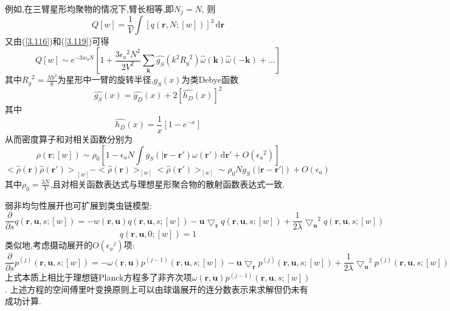 例如,在三臂星形均聚物的情况下,臂长相等,即$N_j = N$,
则
\begin{equation}
Q[w] = \frac{1}{V} \int [q(\mathbf{r},N;[w])]^3\,\mathrm{d} \mathbf{r}
\end{equation}
又由(\ref{3.116})和(\ref{3.119})可得
\begin{equation}
Q[w] \sim e^{-3w_0 N} [1+\frac{3 {\epsilon_a}^2 N^2}{2V^2} \sum_{\mathbf{k}} \hat{g_S}(k^2 {R_g}^2)\hat{\omega}(\mathbf{k})\hat{\omega}(-\mathbf{k})+\dots]
\end{equation}
其中${R_g}^2 = \frac{Nb^2}{6}$为星形中一臂的旋转半径,$g_S(x)$为类Debye函数
\begin{equation}
\hat{g_S}(x) = \hat{g_D}(x) + 2[\hat{h_D}(x)]^2
\end{equation}
其中
\begin{equation}
\hat{h_D}(x) = \frac{1}{x} [1-e^{-x}]
\end{equation}
从而密度算子和对相关函数分别为
\begin{equation}
\rho(\mathbf{r};[w]) \sim \rho_0[1-\epsilon_a N \int g_S(|\mathbf{r}-\mathbf{r}') \omega(\mathbf{r}')\,\mathrm{d} \mathbf{r}'+O({\epsilon_a}^2)]
\end{equation}
\begin{equation}
{<\hat{\rho}(\mathbf{r})\hat{\rho}(\mathbf{r}')>}_{[w]} -<\hat{\rho}(\mathbf{r})>_{[w]} <\hat{\rho}(\mathbf{r}')>_{[w]} \sim \rho_0 N g_S(|\mathbf{r}-\mathbf{r}'|)+O(\epsilon_a)
\end{equation}
其中$\rho_0 = \frac{3N}{V}$,且对相关函数表达式与理想星形聚合物的散射函数表达式一致.

弱非均匀性展开也可扩展到类虫链模型:
$$\frac{\partial}{\partial s}q(\mathbf{r},\mathbf{u},s;[w]) = -w(\mathbf{r},\mathbf{u})q(\mathbf{r},\mathbf{u},s;[w])-\mathbf{u} \bigtriangledown_{\mathbf{r}} q(\mathbf{r},\mathbf{u},s;[w])+\frac{1}{2 \lambda}{\bigtriangledown_{\mathbf{u}}}^2 q(\mathbf{r},\mathbf{u},s;[w])$$
$$q(\mathbf{r},\mathbf{u},0;[w]) = 1$$
类似地,考虑摄动展开的$O({\epsilon_a}^j)$项:
\begin{equation}
\frac{\partial}{\partial s}p^{(j)}(\mathbf{r},\mathbf{u},s;[w]) = -\omega(\mathbf{r},\mathbf{u})p^{(j-1)}(\mathbf{r},\mathbf{u},s;[w])-\mathbf{u} \bigtriangledown_{\mathbf{r}}p^{(j)}(\mathbf{r},\mathbf{u},s;[w])+\frac{1}{2 \lambda}{\bigtriangledown_{\mathbf{u}}}^2 p^{(j)}(\mathbf{r},\mathbf{u},s;[w])
\end{equation}
上式本质上相比于理想链Planck方程多了非齐次项$\omega(\mathbf{r},\mathbf{u})p^{(j-1)}(\mathbf{r},\mathbf{u},s;[w])$.
上述方程的空间傅里叶变换原则上可以由球谐展开的连分数表示来求解但仍未有成功计算.

